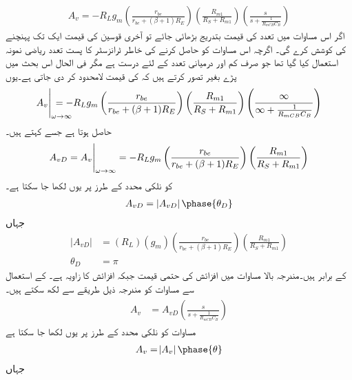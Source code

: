 \begin{align} \label{مساوات_تعددی_ردعمل_ایمپلیفائر_بمع_قابو_کپیسٹر}
A_v=-R_L  g_m \left(\frac{r_{be}}{r_{be}+(\beta+1)R_E} \right ) \left (\frac{R_{m1}}{R_S+R_{m1}} \right ) \left(\frac{s}{s+\frac{1}{R_{mCB} C_B}} \right )
\end{align}
اگر اس مساوات میں تعدد  کی قیمت بتدریج بڑھائی جائے تو آخری قوسین کی قیمت ایک   تک پہنچنے کی کوشش کرے گی۔ اگرچہ اس مساوات کو حاصل کرنے کی خاطر ٹرانزسٹر کا پست تعدد ریاضی نمونہ استعمال کیا گیا تھا جو صرف کم  اور درمیانی تعدد کے لئے درست ہے مگر فی الحال اس بحث میں پڑے بغیر تصور کرتے ہیں کہ  کی قیمت لامحدود کر دی جاتی ہے۔یوں
\begin{align*}
\eval{A_v}_{\omega \to \infty} \hspace{-2em}=-R_L g_m  \left(\frac{r_{be}}{r_{be}+(\beta+1)R_E} \right ) \left (\frac{R_{m1}}{R_S+R_{m1}} \right ) \left(\frac{\infty}{\infty+\frac{1}{R_{mCB} C_B}} \right )
\end{align*}
حاصل ہوتا ہے جسے   کہتے ہیں۔
\begin{align} \label{مساوات_تعددی_ردعمل_قابو_کپیسٹر_لامحدود_تعدد}
A_{vD}=\eval{A_v}_{\omega \to \infty}=-R_L g_m  \left(\frac{r_{be}}{r_{be}+(\beta+1)R_E} \right ) \left (\frac{R_{m1}}{R_S+R_{m1}} \right ) 
\end{align}
 کو نلکی محدد  کے طرز پر یوں لکھا جا سکتا ہے۔
\begin{align}
A_{vD} = \left | {A_{vD}}  \right | \phase{ \theta_D}
\end{align}
جہاں
\begin{align}
\left | A_{vD} \right | &= \left (R_L \right ) \left (g_m \right ) \left (\frac{r_{be}}{r_{be}+\left(\beta+1 \right ) R_E} \right ) \left (\frac{R_{m1}}{R_S+R_{m1}} \right )\\
\theta_D &=\pi
\end{align}
کے برابر ہیں۔مندرجہ بالا مساوات میں   افزائش کی حتمی قیمت جبکہ   افزائش کا زاویہ ہے۔   کے استعمال سے مساوات   کو مندرجہ ذیل طریقے سے لکھ سکتے ہیں۔
\begin{gather} \label{مساوات_تعددی_ردعمل_قابو_کپیسٹر_لامحدود_کا_استعمال}
\begin{aligned}
A_v&=A_{vD} \left(\frac{s}{s+\frac{1}{R_{mCB} C_B}} \right )
\end{aligned}
\end{gather}
مساوات  کو نلکی محدد کے طرز پر یوں لکھا جا سکتا ہے
\begin{align}
A_v =\abs{A_{v}} \phase{\theta}
\end{align}
جہاں

